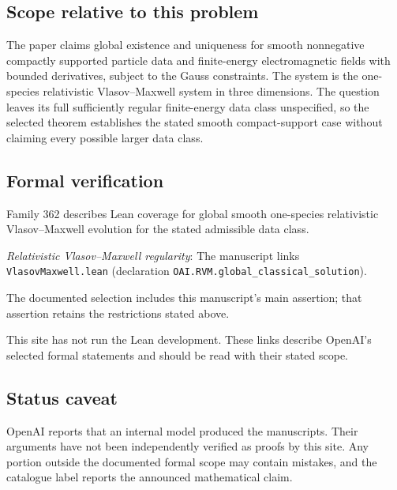 \documentclass[11pt]{article}
\begin{document}
\subsection{Scope relative to this problem}
The paper claims global existence and uniqueness for smooth nonnegative compactly supported particle data and finite-energy electromagnetic fields with bounded derivatives, subject to the Gauss constraints. The system is the one-species relativistic Vlasov--Maxwell system in three dimensions. The question leaves its full sufficiently regular finite-energy data class unspecified, so the selected theorem establishes the stated smooth compact-support case without claiming every possible larger data class.

\subsection{Formal verification}
Family 362 describes Lean coverage for global smooth one-species relativistic Vlasov--Maxwell evolution for the stated admissible data class.

\textit{Relativistic Vlasov--Maxwell regularity}: The manuscript links \texttt{VlasovMaxwell.lean} (declaration \texttt{OAI.RVM.global\_classical\_solution}).

The documented selection includes this manuscript’s main assertion; that assertion retains the restrictions stated above.

This site has not run the Lean development. These links describe OpenAI’s selected formal statements and should be read with their stated scope.

\subsection{Status caveat}
OpenAI reports that an internal model produced the manuscripts. Their arguments have not been independently verified as proofs by this site. Any portion outside the documented formal scope may contain mistakes, and the catalogue label reports the announced mathematical claim.
\end{document}
